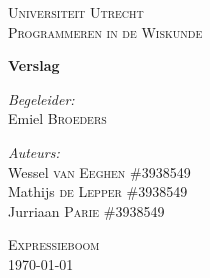 \documentclass[12pt]{article}
\begin{document}
\begin{titlepage}
\begin{center}

\textsc{\LARGE Universiteit Utrecht}\\[1.6cm]

\textsc{\Large Programmeren in de Wiskunde}\vspace{2pc}

{\huge \bfseries Verslag}
\vspace{3pc}

\begin{minipage}{0.7\textwidth}
\begin{flushleft} \large
\emph{Begeleider:} \\
Emiel \textsc{Broeders} 
\end{flushleft}
\begin{flushleft} \large
\emph{Auteurs:}\\
Wessel \textsc{van Eeghen} \tab\#3938549\\
Mathijs \textsc{de Lepper}  \tab\#3938549\\
Jurriaan \textsc{Parie}  \tab\tab\#3938549
\end{flushleft}
\end{minipage}
\begin{minipage}{0.4\textwidth}
\end{minipage}
\vspace{10pc} 

\textsc{\Large Expressieboom}\\[4.0cm]
{\large \today}
\end{center}
\end{titlepage}
\newpage
\end{document}
